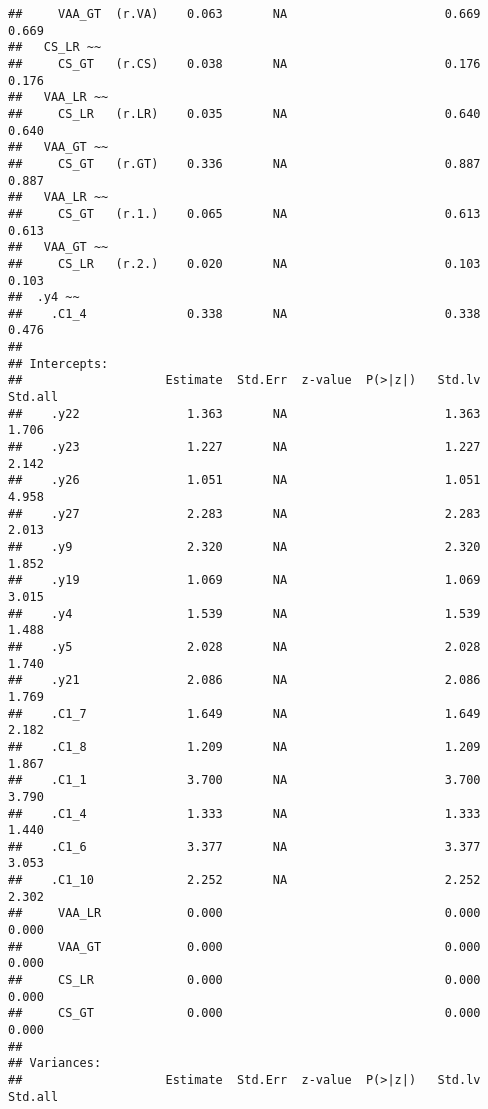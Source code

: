 \documentclass[
]{article}
\begin{document}
\begin{verbatim}
##     VAA_GT  (r.VA)    0.063       NA                      0.669    0.669
##   CS_LR ~~                                                              
##     CS_GT   (r.CS)    0.038       NA                      0.176    0.176
##   VAA_LR ~~                                                             
##     CS_LR   (r.LR)    0.035       NA                      0.640    0.640
##   VAA_GT ~~                                                             
##     CS_GT   (r.GT)    0.336       NA                      0.887    0.887
##   VAA_LR ~~                                                             
##     CS_GT   (r.1.)    0.065       NA                      0.613    0.613
##   VAA_GT ~~                                                             
##     CS_LR   (r.2.)    0.020       NA                      0.103    0.103
##  .y4 ~~                                                                 
##    .C1_4              0.338       NA                      0.338    0.476
## 
## Intercepts:
##                    Estimate  Std.Err  z-value  P(>|z|)   Std.lv  Std.all
##    .y22               1.363       NA                      1.363    1.706
##    .y23               1.227       NA                      1.227    2.142
##    .y26               1.051       NA                      1.051    4.958
##    .y27               2.283       NA                      2.283    2.013
##    .y9                2.320       NA                      2.320    1.852
##    .y19               1.069       NA                      1.069    3.015
##    .y4                1.539       NA                      1.539    1.488
##    .y5                2.028       NA                      2.028    1.740
##    .y21               2.086       NA                      2.086    1.769
##    .C1_7              1.649       NA                      1.649    2.182
##    .C1_8              1.209       NA                      1.209    1.867
##    .C1_1              3.700       NA                      3.700    3.790
##    .C1_4              1.333       NA                      1.333    1.440
##    .C1_6              3.377       NA                      3.377    3.053
##    .C1_10             2.252       NA                      2.252    2.302
##     VAA_LR            0.000                               0.000    0.000
##     VAA_GT            0.000                               0.000    0.000
##     CS_LR             0.000                               0.000    0.000
##     CS_GT             0.000                               0.000    0.000
## 
## Variances:
##                    Estimate  Std.Err  z-value  P(>|z|)   Std.lv  Std.all

\end{verbatim}
\end{document}
